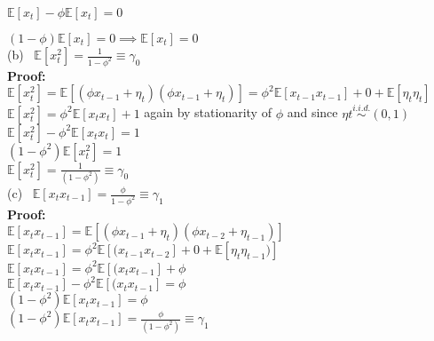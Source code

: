 \documentclass[11pt]{article}
\theoremstyle{definition}
\begin{document}
$\mathbb{E}[x_{t}]-\phi\mathbb{E}[x_{t}]=0$

$(1-\phi)\mathbb{E}[x_{t}]=0 \implies \mathbb{E}[x_{t}]=0 $ \\

\noindent
(b) \ $\mathbb{E}[x_{t}^{2}]=\frac{1}{1-\phi^{2}}\equiv \gamma_{0}$ \\
\textbf{Proof:} \\

$\mathbb{E}[x_{t}^{2}]=\mathbb{E}\left[(\phi x_{t-1} +\eta_{t})(\phi x_{t-1} +\eta_{t})\right]=\phi^{2}\mathbb{E}\left[x_{t-1}x_{t-1}\right]+0+\mathbb{E}[\eta_{t}\eta_{t}]$ \\

$\mathbb{E}[x_{t}^{2}]=\phi^{2}\mathbb{E}\left[x_{t}x_{t}\right]+1$ again by stationarity of $\phi$ and since $\eta{t} \stackrel{i.i.d.}{\sim}(0,1)$ \\

$\mathbb{E}[x_{t}^{2}]-\phi^{2}\mathbb{E}\left[x_{t}x_{t}\right]=1$ \\

$(1-\phi^{2})\mathbb{E}[x_{t}^{2}]=1$ \\

$\mathbb{E}[x_{t}^{2}]=\frac{1}{(1-\phi^{2})}\equiv\gamma_{0}$ \\

\noindent
(c) \ $\mathbb{E}[x_{t}x_{t-1}]=\frac{\phi}{1-\phi^{2}}\equiv \gamma_{1}$ \\
\textbf{Proof:} \\

$\mathbb{E}[x_{t}x_{t-1}]=\mathbb{E}\left[(\phi x_{t-1}+\eta_{t})(\phi x_{t-2}+\eta_{t-1})\right]$ \\

$\mathbb{E}[x_{t}x_{t-1}]=\phi^{2}\mathbb{E}\left[(x_{t-1}x_{t-2}\right]+0+\mathbb{E}\left[\eta_{t}\eta_{t-1})\right]$ \\

$\mathbb{E}[x_{t}x_{t-1}]=\phi^{2}\mathbb{E}\left[(x_{t}x_{t-1}\right]+\phi$ \\

$\mathbb{E}[x_{t}x_{t-1}]-\phi^{2}\mathbb{E}\left[(x_{t}x_{t-1}\right]=\phi$ \\

$(1-\phi^{2})\mathbb{E}[x_{t}x_{t-1}]=\phi$ \\

$(1-\phi^{2})\mathbb{E}[x_{t}x_{t-1}]=\frac{\phi}{(1-\phi^{2})}\equiv\gamma_{1}$
\end{document}

